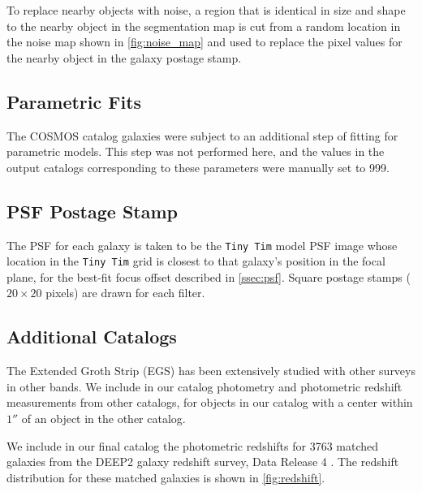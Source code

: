 \documentclass[a4paper,11pt]{article}
\begin{document}
To replace nearby objects with noise, a region that is identical in size and shape to the nearby object in the segmentation map is cut from a random location in the noise map shown in \autoref{fig:noise_map} and used to replace the pixel values for the nearby object in the galaxy postage stamp.  

\subsection{Parametric Fits}
The COSMOS catalog galaxies were subject to an additional step of fitting for parametric models. This step was not performed here, and the values in the output catalogs corresponding to these parameters were manually set to 999.

\subsection{PSF Postage Stamp}
The PSF for each galaxy is taken to be the {\tt Tiny Tim} model PSF image whose location in the {\tt Tiny Tim} grid is closest to that galaxy's position in the focal plane, for the best-fit focus offset described in \autoref{ssec:psf}. Square postage stamps ($20 \times 20$ pixels) are drawn for each filter.

\subsection{Additional Catalogs}
The Extended Groth Strip (EGS) has been extensively studied with other surveys in other bands. 
We include in our catalog photometry and photometric redshift measurements from other catalogs, for objects in our catalog with a center within $1''$ of an object in the other catalog.

We include in our final catalog the photometric redshifts for 3763 matched galaxies from the DEEP2 galaxy redshift survey, Data Release 4 \citep{Newman2013}. 
The redshift distribution for these matched galaxies is shown in \autoref{fig:redshift}. 
\end{document}
